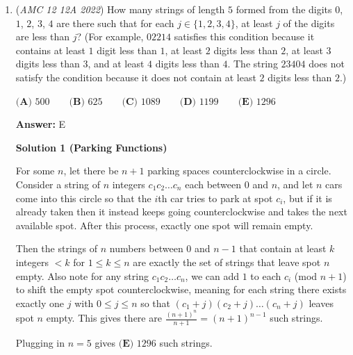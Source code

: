 \begin{enumerate}
 Now, we use the result above to solve this problem.

 Following from this lemma, the list of $n$ with $1 \leq n \leq 22$ and $k_n < L_n$ is
 \[6, 7, 8, 18, 19, 20, 21, 22 .\]

 Therefore, the answer is $\boxed{\textbf{(D) }8}$.

 \textbf{Note: Detailed analysis of this problem (particularly the motivation and the proof of the lemma above) can be found in my video solution below.}

 


	\item (\textit{AMC 12 12A 2022}) How many strings of length $5$ formed from the digits $0$, $1$, $2$, $3$, $4$ are there such that for each $j \in \{1,2,3,4\}$, at least $j$ of the digits are less than $j$? (For example, $02214$ satisfies this condition
because it contains at least $1$ digit less than $1$, at least $2$ digits less than $2$, at least $3$ digits less
than $3$, and at least $4$ digits less than $4$. The string $23404$ does not satisfy the condition because it
does not contain at least $2$ digits less than $2$.)


 $\textbf{(A) }500\qquad\textbf{(B) }625\qquad\textbf{(C) }1089\qquad\textbf{(D) }1199\qquad\textbf{(E) }1296$

 \textbf{Answer: }E



\textbf{Solution 1 (Parking Functions)}

For some $n$, let there be $n+1$ parking spaces counterclockwise in a circle. Consider a string of $n$ integers $c_1c_2 \ldots c_n$ each between $0$ and $n$, and let $n$ cars come into this circle so that the $i$th car tries to park at spot $c_i$, but if it is already taken then it instead keeps going counterclockwise and takes the next available spot. After this process, exactly one spot will remain empty.

 Then the strings of $n$ numbers between $0$ and $n-1$ that contain at least $k$ integers $<k$ for $1 \leq k \leq n$ are exactly the set of strings that leave spot $n$ empty. Also note for any string $c_1c_2 \ldots c_n$, we can add $1$ to each $c_i$ (mod $n+1$) to shift the empty spot counterclockwise, meaning for each string there exists exactly one $j$ with $0 \leq j \leq n$ so that $(c_1+j)(c_2+j) \ldots (c_n+j)$ leaves spot $n$ empty. This gives there are $\frac{(n+1)^{n}}{n+1} = (n+1)^{n-1}$ such strings. 

 Plugging in $n = 5$ gives $\boxed{\textbf{(E) }1296}$ such strings.


\end{enumerate}
